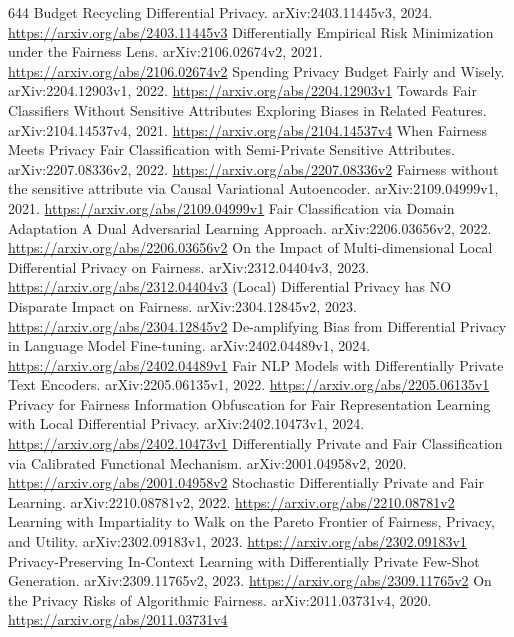 \documentclass[11pt]{article}
\begin{document}
\begin{thebibliography}{644}
 Budget Recycling Differential Privacy. arXiv:2403.11445v3, 2024. \url{https://arxiv.org/abs/2403.11445v3}
 Differentially Empirical Risk Minimization under the Fairness Lens. arXiv:2106.02674v2, 2021. \url{https://arxiv.org/abs/2106.02674v2}
 Spending Privacy Budget Fairly and Wisely. arXiv:2204.12903v1, 2022. \url{https://arxiv.org/abs/2204.12903v1}
 Towards Fair Classifiers Without Sensitive Attributes Exploring Biases in Related Features. arXiv:2104.14537v4, 2021. \url{https://arxiv.org/abs/2104.14537v4}
 When Fairness Meets Privacy Fair Classification with Semi-Private Sensitive Attributes. arXiv:2207.08336v2, 2022. \url{https://arxiv.org/abs/2207.08336v2}
 Fairness without the sensitive attribute via Causal Variational Autoencoder. arXiv:2109.04999v1, 2021. \url{https://arxiv.org/abs/2109.04999v1}
 Fair Classification via Domain Adaptation A Dual Adversarial Learning Approach. arXiv:2206.03656v2, 2022. \url{https://arxiv.org/abs/2206.03656v2}
 On the Impact of Multi-dimensional Local Differential Privacy on Fairness. arXiv:2312.04404v3, 2023. \url{https://arxiv.org/abs/2312.04404v3}
 (Local) Differential Privacy has NO Disparate Impact on Fairness. arXiv:2304.12845v2, 2023. \url{https://arxiv.org/abs/2304.12845v2}
 De-amplifying Bias from Differential Privacy in Language Model Fine-tuning. arXiv:2402.04489v1, 2024. \url{https://arxiv.org/abs/2402.04489v1}
 Fair NLP Models with Differentially Private Text Encoders. arXiv:2205.06135v1, 2022. \url{https://arxiv.org/abs/2205.06135v1}
 Privacy for Fairness Information Obfuscation for Fair Representation Learning with Local Differential Privacy. arXiv:2402.10473v1, 2024. \url{https://arxiv.org/abs/2402.10473v1}
 Differentially Private and Fair Classification via Calibrated Functional Mechanism. arXiv:2001.04958v2, 2020. \url{https://arxiv.org/abs/2001.04958v2}
 Stochastic Differentially Private and Fair Learning. arXiv:2210.08781v2, 2022. \url{https://arxiv.org/abs/2210.08781v2}
 Learning with Impartiality to Walk on the Pareto Frontier of Fairness, Privacy, and Utility. arXiv:2302.09183v1, 2023. \url{https://arxiv.org/abs/2302.09183v1}
 Privacy-Preserving In-Context Learning with Differentially Private Few-Shot Generation. arXiv:2309.11765v2, 2023. \url{https://arxiv.org/abs/2309.11765v2}
 On the Privacy Risks of Algorithmic Fairness. arXiv:2011.03731v4, 2020. \url{https://arxiv.org/abs/2011.03731v4}

\end{thebibliography}
\end{document}
